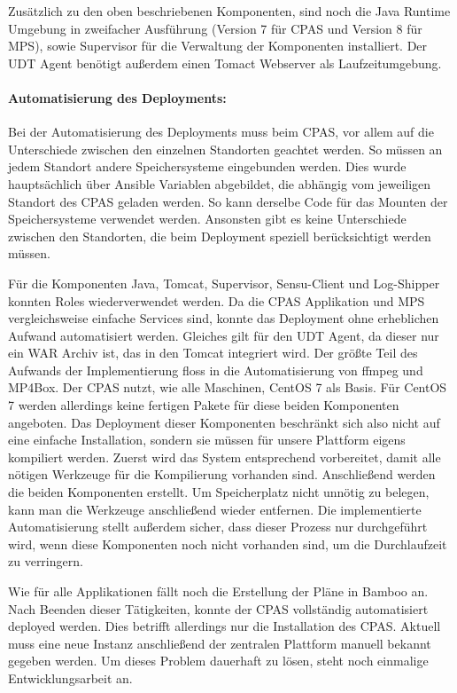Zusätzlich zu den oben beschriebenen Komponenten, sind noch die Java Runtime Umgebung in zweifacher Ausführung (Version 7 für CPAS und Version 8 für MPS), sowie Supervisor für die Verwaltung der Komponenten installiert. Der UDT Agent benötigt außerdem einen Tomact Webserver als Laufzeitumgebung.

\paragraph{Automatisierung des Deployments:}
Bei der Automatisierung des Deployments muss beim CPAS, vor allem auf die Unterschiede zwischen den einzelnen Standorten geachtet werden. So müssen an jedem Standort andere Speichersysteme eingebunden werden. Dies wurde hauptsächlich über Ansible Variablen abgebildet, die abhängig vom jeweiligen Standort des CPAS geladen werden. So kann derselbe Code für das Mounten der Speichersysteme verwendet werden. Ansonsten gibt es keine Unterschiede zwischen den Standorten, die beim Deployment speziell berücksichtigt werden müssen.

Für die Komponenten Java, Tomcat, Supervisor, Sensu-Client und Log-Shipper konnten Roles wiederverwendet werden. Da die CPAS Applikation und MPS vergleichsweise einfache Services sind, konnte das Deployment ohne erheblichen Aufwand automatisiert werden. Gleiches gilt für den UDT Agent, da dieser nur ein WAR Archiv ist, das in den Tomcat integriert wird. Der größte Teil des Aufwands der Implementierung floss in die Automatisierung von ffmpeg und MP4Box. Der CPAS nutzt, wie alle Maschinen, CentOS 7 als Basis. Für CentOS 7 werden allerdings keine fertigen Pakete für diese beiden Komponenten angeboten. Das Deployment dieser Komponenten beschränkt sich also nicht auf eine einfache Installation, sondern sie müssen für unsere Plattform eigens kompiliert werden. Zuerst wird das System entsprechend vorbereitet, damit alle nötigen Werkzeuge für die Kompilierung vorhanden sind. Anschließend werden die beiden Komponenten erstellt. Um Speicherplatz nicht unnötig zu belegen, kann man die Werkzeuge anschließend wieder entfernen. Die implementierte Automatisierung stellt außerdem sicher, dass dieser Prozess nur durchgeführt wird, wenn diese Komponenten noch nicht vorhanden sind, um die Durchlaufzeit zu verringern.

Wie für alle Applikationen fällt noch die Erstellung der Pläne in Bamboo an. Nach Beenden dieser Tätigkeiten, konnte der CPAS vollständig automatisiert deployed werden. Dies betrifft allerdings nur die Installation des CPAS. Aktuell muss eine neue Instanz anschließend der zentralen Plattform manuell bekannt gegeben werden. Um dieses Problem dauerhaft zu lösen, steht noch einmalige Entwicklungsarbeit an.

